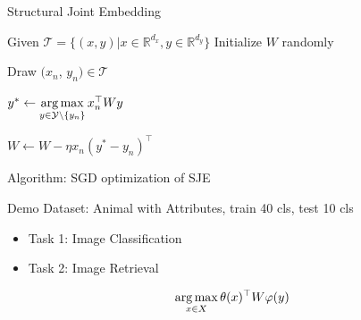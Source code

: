 \documentclass[mathserif, xcolor=table]{beamer}
\def\T{\mathcal{T}}
\def\R{\mathbb{R}}
\def\Y{\mathcal{Y}}
\def\argmax{\mathop{\rm arg\,max}\limits}%
\def\Y{\mathcal{Y}}
\begin{document}
\begin{frame}{Structural Joint Embedding}

\begin{algorithm}[H]
\begin{algorithmic}[1]
\STATE  Given $\T = \{(x, y)| x \in \R^{d_x}, y \in \R^{d_y}\}$ 
\STATE  Initialize $W$ randomly
\pause

\FOR{$n=1$ to $|\T|$}
     		\STATE  Draw $(x_n$, $y_n) \in \T$
     		\pause

     		\STATE $y^* \leftarrow \argmax\limits_{y \in \Y \setminus \{y_n\}} x_n^\top W y$
     		     		\pause

					\STATE	$W \leftarrow W - \eta x_n (y^* - y_n)^\top$ 
        		\ENDIF
\ENDFOR
\ENDFOR
\end{algorithmic}
\caption*{Algorithm: SGD optimization of SJE }
\label{alg:seq}
\end{algorithm}


\end{frame}

\begin{frame}{Demo}
Dataset: Animal with Attributes, train 40 cls, test 10 cls
\begin{itemize}
\item Task 1: Image Classification
\pause
\item Task 2: Image Retrieval
\end{itemize}

\begin{equation*}
	\argmax_{x\in X} \theta(x)^\top W \varphi(y) 
\end{equation*}

\end{frame}
\end{document}
